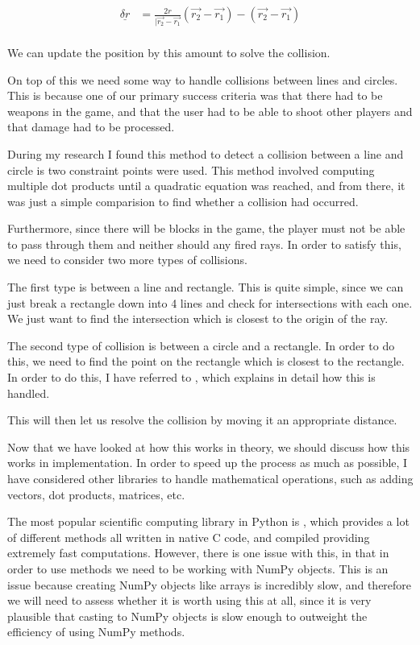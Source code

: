 \begin{align*}
    \underline{\delta r} &= \frac{2r}{|\vec{r_2} - \vec{r_1}} (\vec{r_2} - \vec{r_1}) - (\vec{r_2} - \vec{r_1})\\
\end{align*}

We can update the position by this amount to solve the collision.


\vs
On top of this we need some way to handle collisions between lines and circles. This is because one of our primary success criteria was that there had to be weapons in the game, and that the user had to be able to shoot other players and that damage had to be processed.


\vs
During my research I found this method to detect a collision between a line and circle is two constraint points were used. This method involved computing multiple dot products until a quadratic equation was reached, and from there, it was just a simple comparision to find whether a collision had occurred.


\vs
Furthermore, since there will be blocks in the game, the player must not be able to pass through them and neither should any fired rays. In order to satisfy this, we need to consider two more types of collisions.


\vs
The first type is between a line and rectangle. This is quite simple, since we can just break a rectangle down into 4 lines and check for intersections with each one. We just want to find the intersection which is closest to the origin of the ray.

\vs
The second type of collision is between a circle and a rectangle. In order to do this, we need to find the point on the rectangle which is closest to the rectangle. In order to do this, I have referred to \cite{rectangle_circle_collision}, which explains in detail how this is handled.

\vs
This will then let us resolve the collision by moving it an appropriate distance.

\vs
Now that we have looked at how this works in theory, we should discuss how this works in implementation. In order to speed up the process as much as possible, I have considered other libraries to handle mathematical operations, such as adding vectors, dot products, matrices, etc.

\vs
The most popular scientific computing library in Python is , which provides a lot of different methods all written in native C code, and compiled providing extremely fast computations. However, there is one issue with this, in that in order to use  methods we need to be working with NumPy objects. This is an issue because creating NumPy objects like arrays is incredibly slow, and therefore we will need to assess whether it is worth using this at all, since it is very plausible that casting to NumPy objects is slow enough to outweight the efficiency of using NumPy methods.

